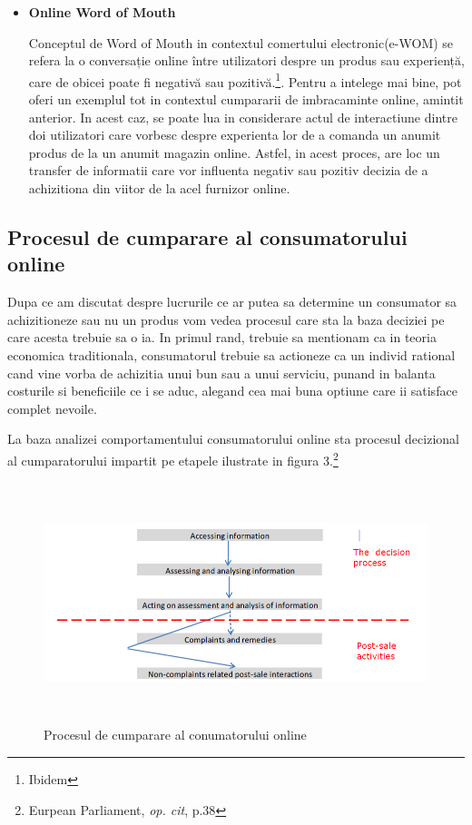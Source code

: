 \documentclass[a4paper, 12pt]{article}
\begin{document}
\begin{itemize}
		\item\textbf{Online Word of Mouth} 
		
		\quad Conceptul de Word of Mouth in contextul comertului electronic(e-WOM) se refera la o conversație online între utilizatori despre un produs sau experiență, care de obicei poate fi negativă sau pozitivă.\footnote{Ibidem}. Pentru a intelege mai bine, pot oferi un exemplul tot in contextul cumpararii de imbracaminte online, amintit anterior. In acest caz, se poate lua in considerare actul de interactiune dintre doi utilizatori care vorbesc despre experienta lor de a comanda un anumit produs de la un anumit magazin online. Astfel, in acest proces, are loc un transfer de informatii care vor influenta negativ sau pozitiv decizia de a achizitiona din viitor de la acel furnizor online.
		
	\end{itemize}

	\subsection{Procesul de cumparare al consumatorului online}
		\quad\quad Dupa ce am discutat despre lucrurile ce ar putea sa determine un consumator sa achizitioneze sau nu un produs vom vedea procesul care sta la baza deciziei pe care acesta trebuie sa o ia. In primul rand, trebuie sa mentionam ca in teoria economica traditionala, consumatorul trebuie sa actioneze ca un individ rational cand vine vorba de achizitia unui bun sau a unui serviciu, punand in balanta costurile si beneficiile ce i se aduc, alegand cea mai buna optiune care ii satisface complet nevoile.
		
		\quad La baza analizei comportamentului consumatorului online sta procesul decizional al cumparatorului impartit pe etapele ilustrate in figura 3.\footnote{Eurpean Parliament, \textit{op. cit}, p.38}
		\begin{figure}[!htb]
			\centering
			\includegraphics[width=12cm, height=7cm]{"figures/third.png"}
			\caption{Procesul de cumparare al conumatorului online}\label{fig:third}
		\end{figure}
	
\end{document}
